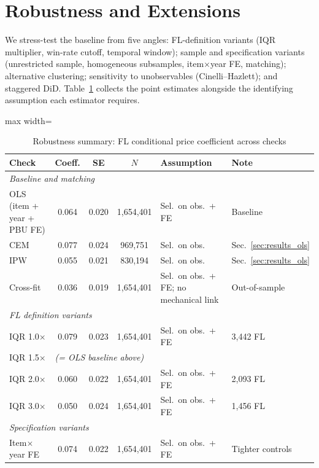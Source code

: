 
\section{Robustness and Extensions}
\label{sec:robustness}


We stress-test the baseline from five angles:
FL-definition variants (IQR multiplier, win-rate cutoff, temporal
window); sample and specification variants (unrestricted sample,
homogeneous subsamples, item$\times$year FE, matching); alternative
clustering; sensitivity to unobservables (Cinelli--Hazlett); and
staggered DiD. Table~\ref{tab:robustness_summary} collects the
point estimates alongside the identifying assumption each estimator
requires.


\begin{table}[htbp]
\centering
\caption{Robustness summary: FL conditional price coefficient across checks}
\label{tab:robustness_summary}
\begin{adjustbox}{max width=\textwidth}
\footnotesize
\begin{tabular}{lcccp{3.2cm}l}
\hline\hline
Check & Coeff. & SE & $N$ & Assumption & Note \\
\hline
\multicolumn{6}{l}{\textit{Baseline and matching}} \\
OLS (item + year + PBU FE) & 0.064 & 0.020 & 1{,}654{,}401 & Sel.\ on obs.\ + FE & Baseline \\
CEM & 0.077 & 0.024 & 969{,}751 & Sel.\ on obs. & Sec.~\ref{sec:results_ols} \\
IPW & 0.055 & 0.021 & 830{,}194 & Sel.\ on obs. & Sec.~\ref{sec:results_ols} \\
Cross-fit & 0.036 & 0.019 & 1{,}654{,}401 & Sel.\ on obs.\ + FE; no mechanical link & Out-of-sample \\
\hline
\multicolumn{6}{l}{\textit{FL definition variants}} \\
IQR 1.0$\times$ & 0.079 & 0.023 & 1{,}654{,}401 & Sel.\ on obs.\ + FE & 3{,}442 FL \\
IQR 1.5$\times$ & \multicolumn{5}{l}{\textit{(= OLS baseline above)}} \\
IQR 2.0$\times$ & 0.060 & 0.022 & 1{,}654{,}401 & Sel.\ on obs.\ + FE & 2{,}093 FL \\
IQR 3.0$\times$ & 0.050 & 0.024 & 1{,}654{,}401 & Sel.\ on obs.\ + FE & 1{,}456 FL \\
\hline
\multicolumn{6}{l}{\textit{Specification variants}} \\
Item$\times$year FE & 0.074 & 0.022 & 1{,}654{,}401 & Sel.\ on obs.\ + FE & Tighter controls \\

\end{tabular}
\end{adjustbox}
\end{table}
